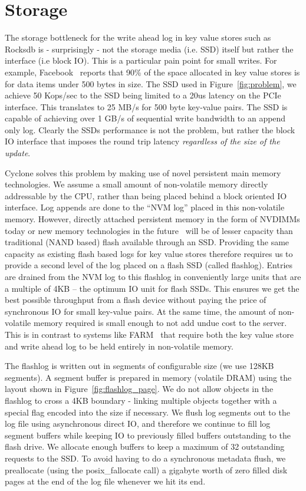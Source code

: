 \documentclass[letterpaper,twocolumn,10pt]{article}
\begin{document}
\section{Storage}
\label{sec:storage}
The storage bottleneck for the write ahead log in key value stores
such as Rocksdb is - surprisingly - not the storage media (i.e. SSD)
itself but rather the interface (i.e block IO). This is a particular
pain point for small writes.  For example,
Facebook~\cite{fb_workload_analysis} reports that 90\% of the space
allocated in key value stores is for data items under 500 bytes in
size.  The SSD used in Figure~\ref{fig:problem}, we achieve 50
Kops/sec to the SSD being limited to a 20us latency on the PCIe
interface. This translates to 25 MB/s for 500 byte key-value
pairs. The SSD is capable of achieving over 1 GB/s of sequential write
bandwidth to an append only log. Clearly the SSDs performance is not
the problem, but rather the block IO interface that imposes the round
trip latency \emph{regardless of the size of the update}.

Cyclone solves this problem by making use of novel persistent main
memory technologies. We assume a small amount of non-volatile memory
directly addressable by the CPU, rather than being placed behind a
block oriented IO interface. Log appends are done to the ``NVM log''
placed in this non-volatile memory. However, directly attached
persistent memory in the form of NVDIMMs today or new memory
technologies in the future~\cite{pmfs} will be of lesser capacity than
traditional (NAND based) flash available through an SSD. Providing the
same capacity as existing flash based logs for key value stores
therefore requires us to provide a second level of the log placed on a
flash SSD (called flashlog).  Entries are drained from the NVM log to
this flashlog in conveniently large units that are a multiple of 4KB
-- the optimum IO unit for flash SSDs. This ensures we get the best
possible throughput from a flash device without paying the price of
synchronous IO for small key-value pairs. At the same time, the amount
of non-volatile memory required is small enough to not add undue cost
to the server. This is in contrast to systems like FARM~\cite{farm}
that require both the key value store and write ahead log to be held
entirely in non-volatile memory.

The flashlog is written out in segments of configurable size (we use 128KB
segments). A segment buffer is prepared in memory (volatile DRAM) using the
layout shown in Figure~\ref{fig:flashlog_page}. We do not allow objects in the
flashlog to cross a 4KB boundary - linking multiple objects together with a
special flag encoded into the size if necessary. We flush log segments out to
the log file using asynchronous direct IO, and therefore we continue to fill log
segment buffers while keeping IO to previously filled buffers outstanding to the
flash drive. We allocate enough buffers to keep a maximum of 32 outstanding
requests to the SSD. To avoid having to do a synchronous metadata flush, we
preallocate (using the posix\_fallocate call) a gigabyte worth of zero filled
disk pages at the end of the log file whenever we hit its end.
\end{document}
